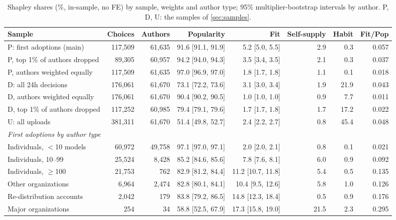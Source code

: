 \begin{table}[t]
\centering
\caption{Shapley shares (\%, in-sample, no FE) by sample, weights and author type; 95\% multiplier-bootstrap intervals by author. P, D, U: the samples of \cref{sec:samples}.}
\label{tab:samples}
\footnotesize
\setlength{\tabcolsep}{3pt}
\begin{tabular}{lrrrrrrr}
\toprule
Sample & Choices & Authors & Popularity & Fit & Self-supply & Habit & Fit/Pop \\
\midrule
P: first adoptions (main) & 117,509 & 61,635 & 91.6 [91.1, 91.9] & 5.2 [5.0, 5.5] & 2.9 & 0.3 & 0.057 \\
P, top 1\% of authors dropped & 89,305 & 60,957 & 94.2 [94.0, 94.3] & 3.5 [3.4, 3.5] & 2.1 & 0.3 & 0.037 \\
P, authors weighted equally & 117,509 & 61,635 & 97.0 [96.9, 97.0] & 1.8 [1.7, 1.8] & 1.1 & 0.1 & 0.018 \\
D: all 24h decisions & 176,061 & 61,670 & 73.1 [72.2, 73.6] & 3.1 [3.0, 3.4] & 1.9 & 21.9 & 0.043 \\
D, authors weighted equally & 176,061 & 61,670 & 90.4 [90.2, 90.5] & 1.0 [1.0, 1.0] & 0.9 & 7.7 & 0.011 \\
D, top 1\% of authors dropped & 117,252 & 60,985 & 79.4 [79.1, 79.6] & 1.7 [1.7, 1.8] & 1.7 & 17.2 & 0.022 \\
U: all uploads & 381,311 & 61,670 & 51.4 [49.8, 52.7] & 2.4 [2.2, 2.7] & 0.8 & 45.4 & 0.048 \\
\midrule
\multicolumn{8}{l}{\emph{First adoptions by author type}} \\
Individuals, $<$10 models & 60,972 & 49,758 & 97.1 [97.0, 97.1] & 2.0 [2.0, 2.1] & 0.8 & 0.1 & 0.021 \\
Individuals, 10--99 & 25,524 & 8,428 & 85.2 [84.6, 85.6] & 7.8 [7.6, 8.1] & 6.0 & 0.9 & 0.092 \\
Individuals, $\ge$100 & 21,753 & 762 & 82.9 [81.2, 84.4] & 11.2 [10.7, 11.8] & 5.4 & 0.5 & 0.135 \\
Other organizations & 6,964 & 2,474 & 82.8 [80.1, 84.1] & 10.4 [9.5, 12.6] & 5.8 & 1.0 & 0.126 \\
Re-distribution accounts & 2,042 & 179 & 83.8 [79.2, 86.5] & 14.8 [12.3, 18.4] & 0.5 & 0.9 & 0.176 \\
Major organizations & 254 & 34 & 58.8 [52.5, 67.9] & 17.3 [15.8, 19.0] & 21.5 & 2.3 & 0.295 \\
\bottomrule
\end{tabular}
\end{table}
